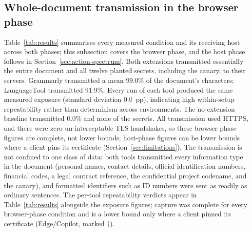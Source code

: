 \documentclass[sigconf,anonymous,review,balance=false]{acmart}
\begin{document}
\subsection{Whole-document transmission in the browser phase}

Table~\ref{tab:results} summarises every measured condition and its receiving host across
both phases; this subsection covers the browser phase, and the host phase follows in
Section~\ref{sec:action-spectrum}. Both
extensions transmitted essentially the entire document and all twelve planted
secrets, including the canary, to their servers. Grammarly transmitted a mean
99.0\% of the document's characters; LanguageTool transmitted 91.9\%.
Every run of each tool produced the same measured exposure (standard deviation 0.0~pp),
indicating high within-setup repeatability rather than determinism across environments. The
no-extension baseline transmitted 0.0\% and none of the secrets. All transmission
used HTTPS, and there were zero un-interceptable TLS handshakes, so these browser-phase
figures are complete, not lower bounds; host-phase figures can be lower bounds where a
client pins its certificate (Section~\ref{sec:limitations}). The transmission is not confined
to one class of data: both tools transmitted every information type in the document (personal
names, contact details, official identification numbers, financial codes, a legal contract
reference, the confidential project codename, and the canary), and formatted identifiers
such as ID numbers were sent as readily as ordinary sentences. The per-tool
repeatability verdicts appear in Table~\ref{tab:results} alongside the exposure figures;
capture was complete for every browser-phase condition and is a lower bound only where a
client pinned its certificate (Edge/Copilot, marked $\dagger$).
\end{document}
